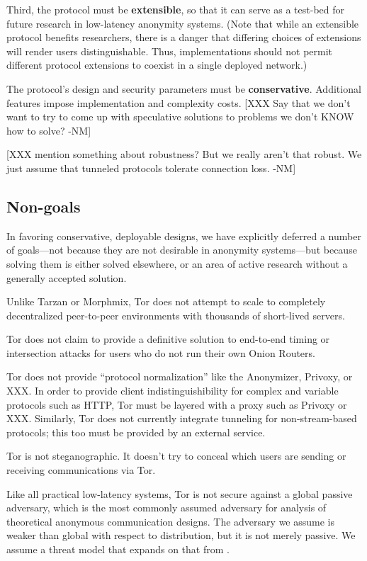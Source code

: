 \documentclass[times,10pt,twocolumn]{article}
\begin{document}
Third, the protocol must be {\bf extensible}, so that it can serve as
a test-bed for future research in low-latency anonymity systems.
(Note that while an extensible protocol benefits researchers, there is
a danger that differing choices of extensions will render users
distinguishable.  Thus, implementations should not permit different
protocol extensions to coexist in a single deployed network.)

The protocol's design and security parameters must be {\bf
conservative}.  Additional features impose implementation and
complexity costs. [XXX Say that we don't want to try to come up with
speculative solutions to problems we don't KNOW how to solve? -NM]

[XXX mention something about robustness?  But we really aren't that
  robust.  We just assume that tunneled protocols tolerate connection
  loss. -NM]

\subsection{Non-goals}
In favoring conservative, deployable designs, we have explicitly
deferred a number of goals---not because they are not desirable in
anonymity systems---but because solving them is either solved
elsewhere, or an area of active research without a generally accepted
solution.

Unlike Tarzan or Morphmix, Tor does not attempt to scale to completely
decentralized peer-to-peer environments with thousands of short-lived
servers. 

Tor does not claim to provide a definitive solution to end-to-end
timing or intersection attacks for users who do not run their own
Onion Routers.

Tor does not provide ``protocol normalization'' like the Anonymizer,
Privoxy, or XXX.  In order to provide client indistinguishibility for
complex and variable protocols such as HTTP, Tor must be layered with
a proxy such as Privoxy or XXX.  Similarly, Tor does not currently
integrate tunneling for non-stream-based protocols; this too must be
provided by an external service.

Tor is not steganographic. It doesn't try to conceal which users are
sending or receiving communications via Tor.


\label{subsec:adversary-model}

Like all practical low-latency systems, Tor is not secure against a
global passive adversary, which is the most commonly assumed adversary
for analysis of theoretical anonymous communication designs. The adversary
we assume
is weaker than global with respect to distribution, but it is not
merely passive.
We assume a threat model that expands on that from \cite{or-pet00}.
\end{document}
